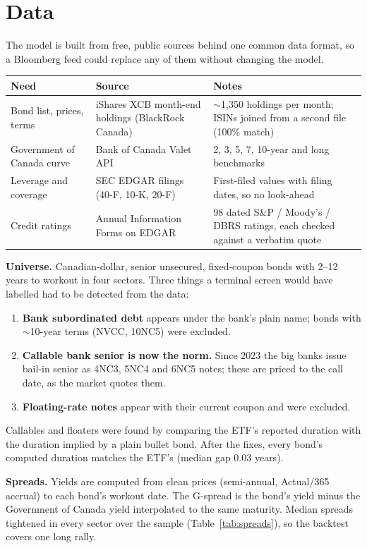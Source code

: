 \documentclass[11pt,letterpaper]{article}
\begin{document}
\section{Data}
The model is built from free, public sources behind one common data format, so a Bloomberg feed could replace any of them without changing the model.

\begin{center}\small
\begin{tabularx}{\linewidth}{@{}l Y Y@{}}
\toprule
Need & Source & Notes \\
\midrule
Bond list, prices, terms & iShares XCB month-end holdings (BlackRock Canada) & $\sim$1,350 holdings per month; ISINs joined from a second file (100\% match) \\
Government of Canada curve & Bank of Canada Valet API & 2, 3, 5, 7, 10-year and long benchmarks \\
Leverage and coverage & SEC EDGAR filings (40-F, 10-K, 20-F) & First-filed values with filing dates, so no look-ahead \\
Credit ratings & Annual Information Forms on EDGAR & 98 dated S\&P / Moody's / DBRS ratings, each checked against a verbatim quote \\
\bottomrule
\end{tabularx}
\end{center}

\textbf{Universe.} Canadian-dollar, senior unsecured, fixed-coupon bonds with 2--12 years to workout in four sectors. Three things a terminal screen would have labelled had to be detected from the data:
\begin{enumerate}[leftmargin=16pt]
  \item \textbf{Bank subordinated debt} appears under the bank's plain name; bonds with $\sim$10-year terms (NVCC, 10NC5) were excluded.
  \item \textbf{Callable bank senior is now the norm.} Since 2023 the big banks issue bail-in senior as 4NC3, 5NC4 and 6NC5 notes; these are priced to the call date, as the market quotes them.
  \item \textbf{Floating-rate notes} appear with their current coupon and were excluded.
\end{enumerate}
Callables and floaters were found by comparing the ETF's reported duration with the duration implied by a plain bullet bond. After the fixes, every bond's computed duration matches the ETF's (median gap 0.03 years).

\textbf{Spreads.} Yields are computed from clean prices (semi-annual, Actual/365 accrual) to each bond's workout date. The G-spread is the bond's yield minus the Government of Canada yield interpolated to the same maturity. Median spreads tightened in every sector over the sample (Table~\ref{tab:spreads}), so the backtest covers one long rally.
\end{document}
